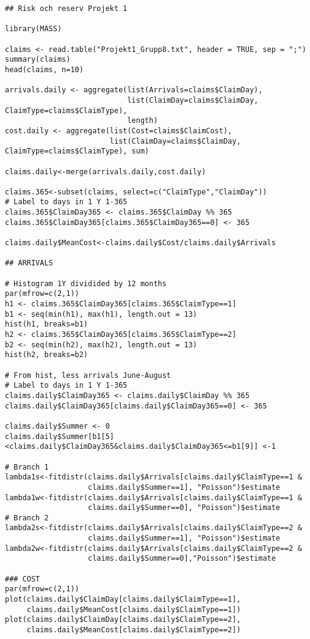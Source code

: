 \documentclass[11pt]{article}
\begin{document}
\begin{verbatim}
## Risk och reserv Projekt 1

library(MASS)

claims <- read.table("Projekt1_Grupp8.txt", header = TRUE, sep = ";")
summary(claims)
head(claims, n=10)

arrivals.daily <- aggregate(list(Arrivals=claims$ClaimDay),
                            list(ClaimDay=claims$ClaimDay, ClaimType=claims$ClaimType),
                            length)
cost.daily <- aggregate(list(Cost=claims$ClaimCost),
                        list(ClaimDay=claims$ClaimDay, ClaimType=claims$ClaimType), sum)

claims.daily<-merge(arrivals.daily,cost.daily)

claims.365<-subset(claims, select=c("ClaimType","ClaimDay"))
# Label to days in 1 Y 1-365
claims.365$ClaimDay365 <- claims.365$ClaimDay %% 365
claims.365$ClaimDay365[claims.365$ClaimDay365==0] <- 365

claims.daily$MeanCost<-claims.daily$Cost/claims.daily$Arrivals

## ARRIVALS

# Histogram 1Y dividided by 12 months
par(mfrow=c(2,1))
h1 <- claims.365$ClaimDay365[claims.365$ClaimType==1]
b1 <- seq(min(h1), max(h1), length.out = 13)
hist(h1, breaks=b1)
h2 <- claims.365$ClaimDay365[claims.365$ClaimType==2]
b2 <- seq(min(h2), max(h2), length.out = 13)
hist(h2, breaks=b2)

# From hist, less arrivals June-August
# Label to days in 1 Y 1-365
claims.daily$ClaimDay365 <- claims.daily$ClaimDay %% 365
claims.daily$ClaimDay365[claims.daily$ClaimDay365==0] <- 365

claims.daily$Summer <- 0
claims.daily$Summer[b1[5]<claims.daily$ClaimDay365&claims.daily$ClaimDay365<=b1[9]] <-1

# Branch 1
lambda1s<-fitdistr(claims.daily$Arrivals[claims.daily$ClaimType==1 &
                   claims.daily$Summer==1], "Poisson")$estimate
lambda1w<-fitdistr(claims.daily$Arrivals[claims.daily$ClaimType==1 &
                   claims.daily$Summer==0], "Poisson")$estimate
# Branch 2
lambda2s<-fitdistr(claims.daily$Arrivals[claims.daily$ClaimType==2 &
                   claims.daily$Summer==1], "Poisson")$estimate
lambda2w<-fitdistr(claims.daily$Arrivals[claims.daily$ClaimType==2 &
                   claims.daily$Summer==0],"Poisson")$estimate

### COST
par(mfrow=c(2,1))
plot(claims.daily$ClaimDay[claims.daily$ClaimType==1],
     claims.daily$MeanCost[claims.daily$ClaimType==1])
plot(claims.daily$ClaimDay[claims.daily$ClaimType==2],
     claims.daily$MeanCost[claims.daily$ClaimType==2])


\end{verbatim}
\end{document}
